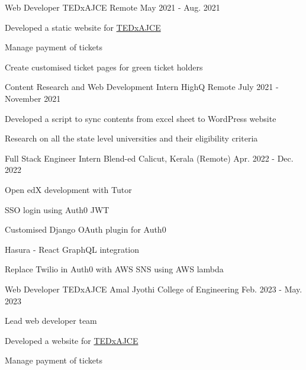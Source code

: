 
\begin{cventries}
  \cventry
    {Web Developer} %
    {TEDxAJCE} %
    {Remote}
    {May 2021 - Aug. 2021} %
    {
      \begin{cvitems} %
        \item Developed a static website for \hyperlink{https://www.tedxajce.in/tedx2021}{TEDxAJCE}
        \item Manage payment of tickets
        \item Create customised ticket pages for green ticket holders
      \end{cvitems}
    }

  \cventry
    {Content Research and Web Development Intern} %
    {HighQ} %
    {Remote} %
    {July 2021 - November 2021} %
    {
      \begin{cvitems} %
        \item Developed a script to sync contents from excel sheet to WordPress website
        \item Research on all the state level universities and their eligibility criteria
      \end{cvitems}
    }

  \cventry
    {Full Stack Engineer Intern} %
    {Blend-ed} %
    {Calicut, Kerala (Remote)   } %
    {Apr. 2022 - Dec. 2022} %
    {
      \begin{cvitems} %
        \item Open edX development with Tutor
        \item SSO login using Auth0 JWT
        \item Customised Django OAuth plugin for Auth0
        \item Hasura - React GraphQL integration
        \item Replace Twilio in Auth0 with AWS SNS using AWS lambda
      \end{cvitems}
    }

  \cventry
    {Web Developer} %
    {TEDxAJCE} %
    {Amal Jyothi College of Engineering}
    {Feb. 2023 - May. 2023} %
    {
      \begin{cvitems} %
        \item Lead web developer team
        \item Developed a website for \hyperlink{https://www.tedxajce.in/tedx2023}{TEDxAJCE}
        \item Manage payment of tickets
      \end{cvitems}
    }


\end{cventries}
